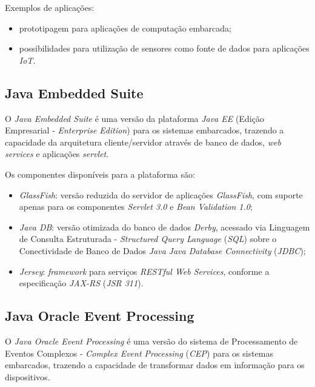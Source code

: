 Exemplos de aplicações:

\begin{itemize}
    
    \item prototipagem para aplicações de computação embarcada;
    
    \item possibilidades para utilização de sensores como fonte de dados para 
    aplicações \textit{IoT}.
    
\end{itemize}

\subsection{Java Embedded Suite}

O \textit{Java Embedded Suite} é uma versão da plataforma \textit{Java EE}
(Edição Empresarial - \textit{Enterprise Edition}) para os sistemas embarcados,
trazendo a capacidade da arquitetura cliente/servidor através de banco de
dados, \textit{web services} e aplicações \textit{servlet}.

Os componentes disponíveis para a plataforma são:

\begin{itemize}
    
    \item \textit{GlassFish}: versão reduzida do servidor de aplicações
    \textit{GlassFish}, com suporte apenas para os componentes \textit{Servlet
    3.0} e \textit{Bean Validation 1.0};
    
    \item \textit{Java DB}: versão otimizada do banco de dados \textit{Derby},
    acessado via Linguagem de Consulta Estruturada - \textit{Structured Query
    Language} (\textit{SQL}) sobre o Conectividade de Banco de Dados
    \textit{Java} \textit{Java Database Connectivity} (\textit{JDBC});
    
    \item \textit{Jersey}: \textit{framework} para serviços \textit{RESTful Web 
    Services}, conforme a especificação \textit{JAX-RS} (\textit{JSR 311}).

\end{itemize}

\subsection{Java Oracle Event Processing}

O \textit{Java Oracle Event Processing} é uma versão do sistema de 
Processamento de Eventos Complexos - \textit{Complex Event Processing} 
(\textit{CEP}) para os sistemas embarcados, trazendo a capacidade de 
transformar dados em informação para os dispositivos.

